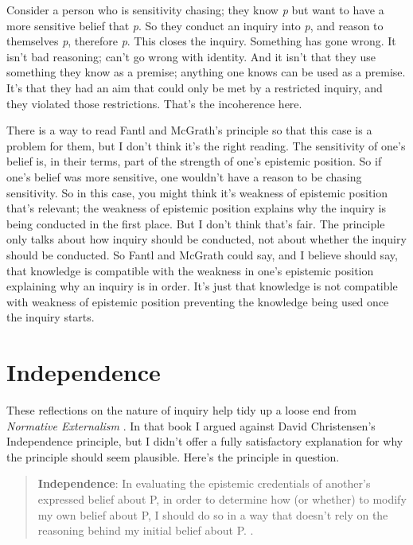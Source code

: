 \documentclass[
  11pt,
]{book}
\begin{document}
Consider a person who is sensitivity chasing; they know \emph{p} but want to have a more sensitive belief that \emph{p}. So they conduct an inquiry into \emph{p}, and reason to themselves \emph{p}, therefore \emph{p}. This closes the inquiry. Something has gone wrong. It isn't bad reasoning; can't go wrong with identity. And it isn't that they use something they know as a premise; anything one knows can be used as a premise. It's that they had an aim that could only be met by a restricted inquiry, and they violated those restrictions. That's the incoherence here.

There is a way to read Fantl and McGrath's principle so that this case is a problem for them, but I don't think it's the right reading. The sensitivity of one's belief is, in their terms, part of the strength of one's epistemic position. So if one's belief was more sensitive, one wouldn't have a reason to be chasing sensitivity. So in this case, you might think it's weakness of epistemic position that's relevant; the weakness of epistemic position explains why the inquiry is being conducted in the first place. But I don't think that's fair. The principle only talks about how inquiry should be conducted, not about whether the inquiry should be conducted. So Fantl and McGrath could say, and I believe should say, that knowledge is compatible with the weakness in one's epistemic position explaining why an inquiry is in order. It's just that knowledge is not compatible with weakness of epistemic position preventing the knowledge being used once the inquiry starts.

\hypertarget{independence}{%
\section{Independence}\label{independence}}

These reflections on the nature of inquiry help tidy up a loose end from \emph{Normative Externalism} \citep{Weatherson2019}. In that book I argued against David Christensen's Independence principle, but I didn't offer a fully satisfactory explanation for why the principle should seem plausible. Here's the principle in question.

\begin{quote}
\textbf{Independence}: In evaluating the epistemic credentials of another's expressed belief about P, in order to determine how (or whether) to modify my own belief about P, I should do so in a way that doesn't rely on the reasoning behind my initial belief about P. \citep[1-2]{Christensen2011}.
\end{quote}
\end{document}
